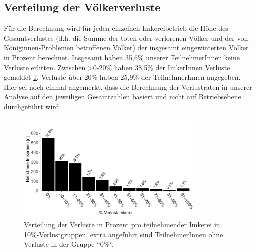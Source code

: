 

\subsection{Verteilung der Völkerverluste}

Für die Berechnung wird für jeden einzelnen Imkereibetrieb die Höhe des Gesamtverlustes (d.h. die Summe der toten oder verlorenen Völker und der von Königinnen-Problemen betroffenen Völker) der insgesamt eingewinterten Völker in Prozent berechnet. Insgesamt haben 35,6\% unserer TeilnehmerInnen keine Verluste erlitten. Zwischen >0-20\% haben  38.5\% der ImkerInnen Verluste gemeldet \cref{fig:u:loss:distribution}. Verluste über 20\% haben 25,9\% der TeilnehmerInnen angegeben. Hier sei noch einmal angemerkt, dass die Berechnung der Verlustraten in unserer Analyse auf den jeweiligen Gesamtzahlen basiert und nicht auf Betriebsebene durchgeführt wird.

\begin{figure}[H]
  \centering
  \includegraphics[keepaspectratio,width=0.8\textwidth]{project-U-wintersterblichkeit/figures/plot_overview_loss_dist}
  \caption{Verteilung der Verluste in Prozent pro teilnehmender Imkerei in 10\%-Verlustgruppen, extra angeführt sind TeilnehmerInnen ohne Verluste in der Gruppe \enquote{0\%}.}
  \label{fig:u:loss:distribution}
\end{figure}

